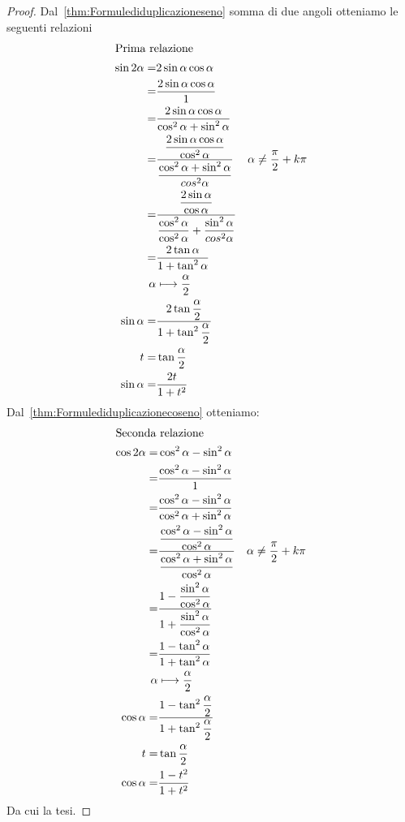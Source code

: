 \begin{proof} Dal~\vref{thm:Formulediduplicazioneseno} somma di due angoli otteniamo le seguenti relazioni
	\begin{align*}
	\intertext{Prima relazione}
	\sin2\alpha=&2\sin\alpha\cos\alpha\\
	=&\frac{2\sin\alpha\cos\alpha}{1}\\
	=&\frac{2\sin\alpha\cos\alpha}{\cos^2\alpha+\sin^2\alpha}\\
	=&\dfrac{\dfrac{2\sin\alpha\cos\alpha}{\cos^2\alpha}}{\dfrac{\cos^2\alpha+\sin^2\alpha}{cos^2\alpha}}&\alpha\neq\frac{\pi}{2}+k\pi\\
	=&\dfrac{\dfrac{2\sin\alpha}{\cos\alpha}}{\dfrac{\cos^2\alpha}{\cos^2\alpha}+\dfrac{\sin^2\alpha}{cos^2\alpha}}\\
	=&\dfrac{2\tan\alpha}{1+\tan^2\alpha}\\
	\alpha&\longmapsto\dfrac{\alpha}{2}\\
	\sin\alpha=&\dfrac{2\tan\dfrac{\alpha}{2}}{1+\tan^2\dfrac{\alpha}{2}}\\
	t=&\tan\frac{\alpha}{2}\\
	\sin\alpha=&\frac{2t}{1+t^2}\\
	\end{align*}
	Dal~\vref{thm:Formulediduplicazionecoseno} otteniamo:
	\begin{align*}
	\intertext{Seconda relazione}
	\cos 2\alpha=&\cos^2\alpha-\sin^2\alpha\\
	=&\dfrac{\cos^2\alpha-\sin^2\alpha}{1}\\
	=&\frac{\cos^2\alpha-\sin^2\alpha}{\cos^2\alpha+\sin^2\alpha}\\
	=&\frac{\dfrac{\cos^2\alpha-\sin^2\alpha}{\cos^2\alpha}}{\dfrac{\cos^2\alpha+\sin^2\alpha}{\cos^2\alpha}}&\alpha\neq\frac{\pi}{2}+k\pi\\ 
	=&\frac{1-\dfrac{\sin^2\alpha}{\cos^2\alpha}}{1+\dfrac{\sin^2\alpha}{\cos^2\alpha}}\\
	=&\frac{1-\tan^2\alpha}{1+\tan^2\alpha}\\
	\alpha&\longmapsto\dfrac{\alpha}{2}\\
	\cos\alpha=&\frac{1-\tan^2\dfrac{\alpha}{2}}{1+\tan^2\dfrac{\alpha}{2}}\\
	t=&\tan\frac{\alpha}{2}\\
	\cos\alpha=&\frac{1-t^2}{1+t^2}
	\end{align*}
	Da cui la tesi.
\end{proof}
